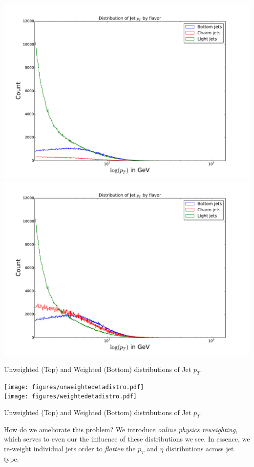 \begin{FPfigure}
\includegraphics[width=\textwidth]{figures/unweightedpTdistro.pdf}\\
\includegraphics[width=\textwidth]{figures/weightedpTdistro.pdf}
\caption[The ATLAS detector]{Unweighted (Top) and Weighted (Bottom) distributions of Jet $p_T$.
\label{fig:pT}}
\end{FPfigure}
\begin{FPfigure}
\texttt{[image: figures/unweightedetadistro.pdf]}\\
\texttt{[image: figures/weightedetadistro.pdf]}
\caption[The ATLAS detector]{Unweighted (Top) and Weighted (Bottom) distributions of Jet $p_T$.
\label{fig:eta}}
\end{FPfigure}


How do we ameliorate this problem? We introduce \emph{online physics reweighting}, which serves to even our the influence of these distributions we see. In essence, we re-weight individual jets order to \emph{flatten} the $p_T$ and $\eta$ distributions across jet type. 

